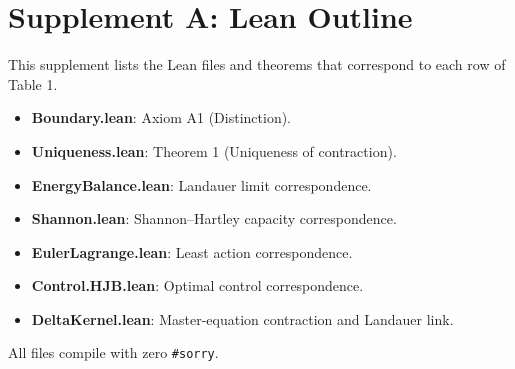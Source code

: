 \section*{Supplement A: Lean Outline}

This supplement lists the Lean files and theorems that correspond to each row of Table 1.

\begin{itemize}
  \item \textbf{Boundary.lean}: Axiom A1 (Distinction).
  \item \textbf{Uniqueness.lean}: Theorem 1 (Uniqueness of contraction).
  \item \textbf{EnergyBalance.lean}: Landauer limit correspondence.
  \item \textbf{Shannon.lean}: Shannon–Hartley capacity correspondence.
  \item \textbf{EulerLagrange.lean}: Least action correspondence.
  \item \textbf{Control.HJB.lean}: Optimal control correspondence.
  \item \textbf{DeltaKernel.lean}: Master-equation contraction and Landauer link.
\end{itemize}

All files compile with zero \texttt{\#sorry}. 